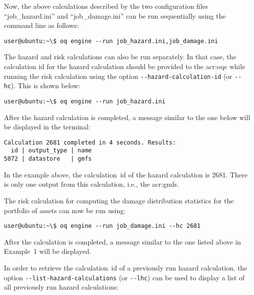 Now, the above calculations described by the two configuration files
``job\_hazard.ini'' and ``job\_damage.ini'' can be run sequentially using the
command line as follows:

\begin{verbatim}
user@ubuntu:~\$ oq engine --run job_hazard.ini,job_damage.ini
\end{verbatim}

The hazard and risk calculations can also be run separately. In that case, the
calculation id for the hazard calculation should be
provided to the \glsdesc{acr:oqe} while running the risk calculation using the
option \Verb+--hazard-calculation-id+ (or \Verb+--hc+). This is shown below:

\begin{verbatim}
user@ubuntu:~\$ oq engine --run job_hazard.ini
\end{verbatim}

After the hazard calculation is completed, a message similar to the one below
will be displayed in the terminal:

\begin{verbatim}
Calculation 2681 completed in 4 seconds. Results:
  id | output_type | name
5072 | datastore   | gmfs
\end{verbatim}

In the example above, the calculation~id of the hazard calculation is 2681.
There is only one output from this calculation, i.e., the \glspl{acr:gmf}.

The risk calculation for computing the damage distribution statistics for the
portfolio of \glspl{asset} can now be run using:

\begin{verbatim}
user@ubuntu:~\$ oq engine --run job_damage.ini --hc 2681
\end{verbatim}

After the calculation is completed, a message similar to the one listed above
in Example~1 will be displayed.

In order to retrieve the calculation~id of a previously run hazard calculation,
the option \Verb+--list-hazard-calculations+ (or \Verb+--lhc+) can be used to
display a list of all previously run hazard calculations:

